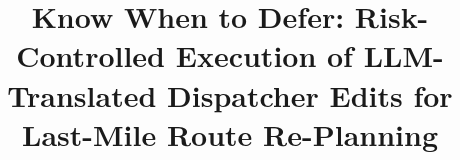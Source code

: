\documentclass[conference]{IEEEtran}
\begin{document}
\title{Know When to Defer: Risk-Controlled Execution of LLM-Translated Dispatcher Edits for Last-Mile Route Re-Planning}

\author{}

\maketitle
\thispagestyle{plain}
\pagestyle{plain}











\nocite{*}


\end{document}
